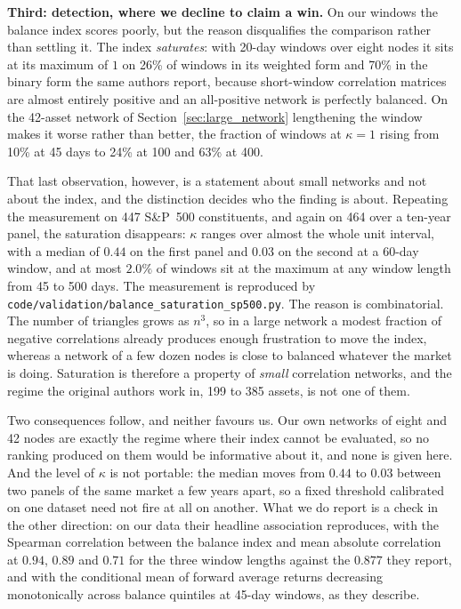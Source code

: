 \documentclass[11pt,a4paper]{article}
\begin{document}
\textbf{Third: detection, where we decline to claim a win.} On our windows the
balance index scores poorly, but the reason disqualifies the comparison rather
than settling it. The index \emph{saturates}: with 20-day windows over eight
nodes it sits at its maximum of $1$ on 26\% of windows in its weighted form and
70\% in the binary form the same authors report, because short-window
correlation matrices are almost entirely positive and an all-positive network
is perfectly balanced. On the 42-asset network of
Section~\ref{sec:large_network} lengthening the window makes it worse rather
than better, the fraction of windows at $\kappa = 1$ rising from 10\% at 45 days
to 24\% at 100 and 63\% at 400.

That last observation, however, is a statement about small networks and not
about the index, and the distinction decides who the finding is about. Repeating the measurement on 447 S\&P~500 constituents, and again on
464 over a ten-year panel, the saturation disappears: $\kappa$ ranges over
almost the whole unit interval, with a median of $0.44$ on the first panel and
$0.03$ on the second at a 60-day window, and at most $2.0\%$ of windows sit at
the maximum at any window length from 45 to 500 days. The measurement is
reproduced by \texttt{code/validation/balance\_saturation\_sp500.py}. The reason is combinatorial. The number of triangles
grows as $n^3$, so in a large network a modest fraction of negative correlations
already produces enough frustration to move the index, whereas a network of a
few dozen nodes is close to balanced whatever the market is doing. Saturation is
therefore a property of \emph{small} correlation networks, and the regime the
original authors work in, 199 to 385 assets, is not one of them.

Two consequences follow, and neither favours us. Our own networks of eight and
42 nodes are exactly the regime where their index cannot be evaluated, so no
ranking produced on them would be informative about it, and none is given here. And the
level of $\kappa$ is not portable: the median moves from $0.44$ to $0.03$
between two panels of the same market a few years apart, so a fixed threshold
calibrated on one dataset need not fire at all on another. What we do
report is a check in the other direction: on our data their headline
association reproduces, with the Spearman correlation between the balance index
and mean absolute correlation at $0.94$, $0.89$ and $0.71$ for the three window
lengths against the $0.877$ they report, and with the conditional mean of
forward average returns decreasing monotonically across balance quintiles at
45-day windows, as they describe.
\end{document}
